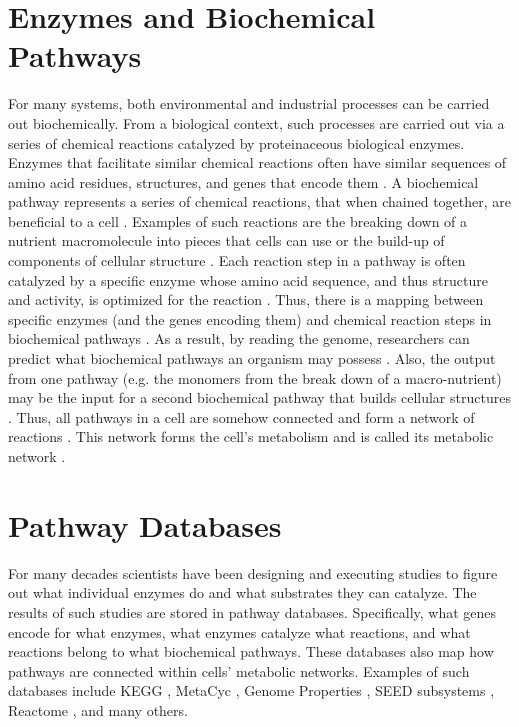\section{Enzymes and Biochemical Pathways} \label{enzymes-and-pathways} 

For many systems, both environmental and industrial processes can be carried out biochemically. From a biological context, such processes are carried out via a series of chemical reactions catalyzed by proteinaceous biological enzymes. Enzymes that facilitate similar chemical reactions often \cite{galperin1998analogous} have similar sequences of amino acid residues, structures, and genes that encode them \cite{zhang2003evolution}. A biochemical pathway represents a series of chemical reactions, that when chained together, are beneficial to a cell \cite{michal2012biochemical}. Examples of such reactions are the breaking down of a nutrient macromolecule into pieces that cells can use or the build-up of components of cellular structure \cite{wagner2012metabolic}. Each reaction step in a pathway is often \cite{keller2015widespread,tawfik2010enzyme} catalyzed by a specific enzyme whose amino acid sequence, and thus structure and activity, is optimized for the reaction \cite{michal2012biochemical,zhang2003evolution,fersht1999structure}. Thus, there is a mapping between specific enzymes (and the genes encoding them) and chemical reaction steps in biochemical pathways \cite{thiele2010protocol}. As a result, by reading the genome, researchers can predict what biochemical pathways an organism may possess \cite{abubucker2012metabolic,thiele2010protocol}. Also, the output from one pathway (e.g. the monomers from the break down of a macro-nutrient) may be the input for a second biochemical pathway that builds cellular structures \cite{wagner2012metabolic,stelling2002metabolic}. Thus, all pathways in a cell are somehow connected and form a network of reactions \cite{wagner2012metabolic,stelling2002metabolic}. This network forms the cell's metabolism and is called its metabolic network \cite{wagner2012metabolic}.

\section{Pathway Databases} \label{pathway-databases}

For many decades scientists have been designing and executing studies to figure out what individual enzymes do and what substrates they can catalyze. The results of such studies are stored in pathway databases. Specifically, what genes encode for what enzymes, what enzymes catalyze what reactions, and what reactions belong to what biochemical pathways. These databases also map how pathways are connected within cells' metabolic networks. Examples of such databases include KEGG \cite{kanehisa2000kegg}, MetaCyc \cite{karp2002metacyc}, Genome Properties \cite{richardson2018genome}, SEED subsystems \cite{overbeek2005subsystems}, Reactome \cite{croft2013reactome}, and many others.

